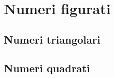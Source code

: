 \chapter{Numeri figurati}
\section{Numeri triangolari}
\begin{center}
	
\end{center}
\section{Numeri quadrati}
\begin{center}

\end{center}
